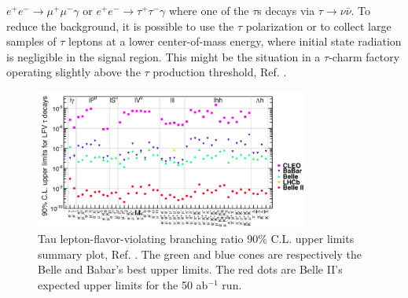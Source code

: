 $e^+ e^- \rightarrow \mu^+ \mu^- \gamma$ or $e^+ e^- \rightarrow \tau^+ \tau^- \gamma$ where one of the $\tau$s decays via $\tau \rightarrow \nu \bar{\nu}$.
To reduce the background, it is possible to use the $\tau$ polarization or to collect large samples of
$\tau$ leptons at a lower center-of-mass energy, where initial state radiation is negligible in the signal region. This might be the situation in a $\tau$-charm 
factory operating slightly above the $\tau$ production threshold, Ref. \cite{Bennett_2016}.
\begin{figure}[!h]
\centering
\includegraphics[width =0.8\textwidth]{figures/png/Screenshot_20240319_134052.png}
\caption{Tau lepton-flavor-violating branching ratio 90\% C.L. upper limits summary plot, Ref. \cite{universe4100101}. The green and blue cones 
are respectively the Belle and Babar's best upper limits. The red dots are Belle II's expected upper limits for the 50 ab$^{-1}$ run.}
\label{fig:tauchannel}
\end{figure}

